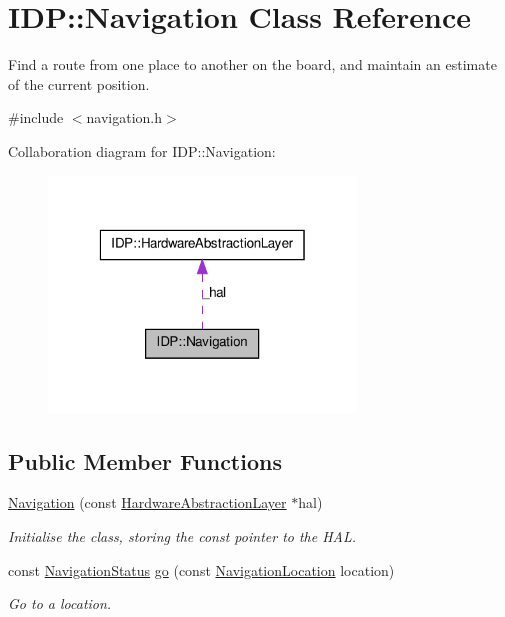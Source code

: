 \hypertarget{classIDP_1_1Navigation}{
\section{IDP::Navigation Class Reference}
\label{classIDP_1_1Navigation}
}


Find a route from one place to another on the board, and maintain an estimate of the current position.  




{\ttfamily \#include $<$navigation.h$>$}



Collaboration diagram for IDP::Navigation:\nopagebreak
\begin{figure}[H]
\begin{center}
\leavevmode
\includegraphics[width=232pt]{classIDP_1_1Navigation__coll__graph}
\end{center}
\end{figure}
\subsection*{Public Member Functions}
\begin{DoxyCompactItemize}
\item 
\hyperlink{classIDP_1_1Navigation_a028ddc27093e3d5de2dfac886c15d478}{Navigation} (const \hyperlink{classIDP_1_1HardwareAbstractionLayer}{HardwareAbstractionLayer} $\ast$hal)
\begin{DoxyCompactList}\small\item\em Initialise the class, storing the const pointer to the HAL. \item\end{DoxyCompactList}\item 
const \hyperlink{namespaceIDP_a1a96e566e4d675fdf20780cc96d92283}{NavigationStatus} \hyperlink{classIDP_1_1Navigation_ab5cf30dd7a21c90d2ae58309ce0ddfa6}{go} (const \hyperlink{namespaceIDP_ab9c412f0fd539b5d70385066c30465a0}{NavigationLocation} location)
\begin{DoxyCompactList}\small\item\em Go to a location. \item\end{DoxyCompactList}\end{DoxyCompactItemize}


